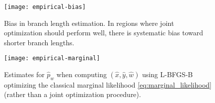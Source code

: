 
\begin{figure}
\centering
\texttt{[image: empirical-bias]}
\caption{
Bias in branch length estimation.
In regions where joint optimization should perform well, there is systematic bias toward shorter branch lengths.
}
\label{fig:empirical-bias}
\end{figure}


\begin{figure}
\centering
\texttt{[image: empirical-marginal]}
\caption{
    Estimates for $\hat{p}_w$ when computing $(\hat{x}, \hat{y}, \hat{w})$ using L-BFGS-B optimizing the classical marginal likelihood \eqref{eq:marginal_likelihood} (rather than a joint optimization procedure).
}
\label{fig:bl-general-marginal}
\end{figure}
%

